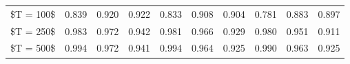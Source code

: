 % 
\begin{tabular}{cccccccccc}
  \hline
  \hline
\$T = 100\$ & 0.839 & 0.920 & 0.922 & 0.833 & 0.908 & 0.904 & 0.781 & 0.883 & 0.897 \\ 
  \$T = 250\$ & 0.983 & 0.972 & 0.942 & 0.981 & 0.966 & 0.929 & 0.980 & 0.951 & 0.911 \\ 
  \$T = 500\$ & 0.994 & 0.972 & 0.941 & 0.994 & 0.964 & 0.925 & 0.990 & 0.963 & 0.925 \\ 
   \hline
\end{tabular}
